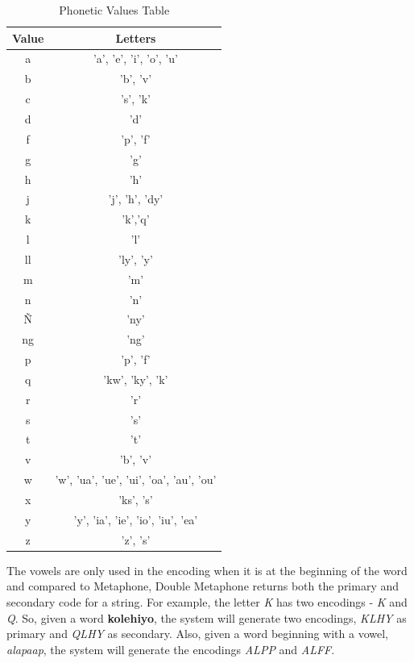 \documentclass[12pt]{book}
\begin{document}
\begin{table}
\begin{center}
\begin{tabular}{ |c|c| } 
 \hline
 Value & Letters\\
 \hline
 a & 'a', 'e', 'i', 'o', 'u' \\
 \hline
 b & 'b', 'v' \\
 \hline
 c & 's', 'k' \\
 \hline
 d & 'd' \\
 \hline
 f & 'p', 'f' \\
 \hline
 g & 'g' \\
 \hline
 h & 'h' \\
 \hline
 j & 'j', 'h', 'dy' \\
 \hline
 k & 'k','q' \\
 \hline
 l & 'l' \\
 \hline
 ll & 'ly', 'y' \\
 \hline
 m & 'm' \\
 \hline
 n & 'n' \\
 \hline
 Ñ & 'ny' \\
 \hline
 ng & 'ng' \\
 \hline
 p & 'p', 'f' \\
 \hline
 q & 'kw', 'ky', 'k' \\
 \hline
 r & 'r' \\
 \hline
 s & 's' \\
 \hline
 t & 't' \\
 \hline
 v & 'b', 'v' \\
 \hline
 w & 'w', 'ua', 'ue', 'ui', 'oa', 'au', 'ou' \\
 \hline
 x & 'ks', 's' \\
 \hline
 y & 'y', 'ia', 'ie', 'io', 'iu', 'ea' \\
 \hline
 z & 'z', 's' \\
 \hline
\end{tabular}
\caption{Phonetic Values Table} \label{phoneticvalues}
\end{center}
\end{table}

The vowels are only used in the encoding when it is at the beginning of the word and compared to Metaphone, Double Metaphone returns both the primary and secondary code for a string. For example, the letter \textit{K} has two encodings - \textit{K} and \textit{Q}. So, given a word \textbf{kolehiyo}, the system will generate two encodings, \textit{KLHY} as primary and \textit{QLHY} as secondary. Also, given a word beginning with a vowel, \textit{alapaap}, the system will generate the encodings \textit{ALPP} and \textit{ALFF}.
\end{document}
